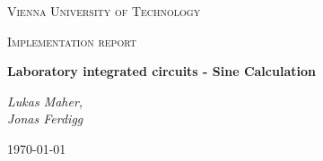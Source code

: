 
\begin{titlepage}
	\centering
	{\scshape\LARGE Vienna University of Technology \par}
	\vspace{1cm}
	{\scshape\Large Implementation report \par}
	\vspace{1.5cm}
	{\huge\bfseries Laboratory integrated circuits - Sine Calculation \par}
	\vspace{2cm}
	{\Large\itshape Lukas Maher, \\ Jonas Ferdigg \par}
	\vfill

	{\large \today\par}
\end{titlepage}


